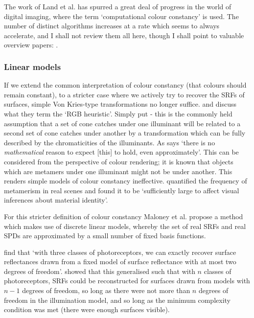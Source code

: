 The work of Land et al. has spurred a great deal of progress in the world of digital imaging, where the term `computational colour constancy' is used. The number of distinct algorithms increases at a rate which seems to always accelerate, and I shall not review them all here, though I shall point to valuable overview papers:  \citet{hordley_reevaluation_2006, gijsenij_computational_2011}.

\subsubsection{Linear models}

If we extend the common interpretation of colour constancy (that colours should remain constant), to a stricter case where we actively try to recover the \glspl{SRF} of surfaces, simple Von Kries-type transformations no longer suffice. \citet{maloney_physics-based_2001} and \citet{yang_illuminant_2001} discuss what they term the `RGB heuristic'. Simply put - this is the commonly held assumption that a set of cone catches under one illuminant will be related to a second set of cone catches under another by a transformation which can be fully described by the chromaticities of the illuminants. As \citet{maloney_physics-based_2001} says `there is no \emph{mathematical} reason to expect [this] to hold, even approximately'. This can be considered from the perspective of colour rendering; it is known that objects which are metamers under one illuminant might not be under another. This renders simple models of colour constancy ineffective. \citet{foster_frequency_2006} quantified the frequency of metamerism in real scenes and found it to be `sufficiently large to affect visual inferences about material identity'.

For this stricter definition of colour constancy Maloney et al. \citep{maloney_computational_1984, maloney_color_1986} propose a method which makes use of discrete linear models, whereby the set of real \glspl{SRF} and real \glspl{SPD} are approximated by a small number of fixed basis functions. 

\citet{maloney_color_1986} find that `with three classes of photoreceptors, we can exactly recover surface reflectances drawn from a fixed model of surface reflectance with at most two degrees of freedom'. \citet{maloney_computational_1984} showed that this generalised such that with $n$ classes of photoreceptors, \glspl{SRF} could be reconstructed for surfaces drawn from models with $n-1$ degrees of freedom, so long as there were not more than $n$ degrees of freedom in the illumination model, and so long as the minimum complexity condition was met (there were enough surfaces visible).

